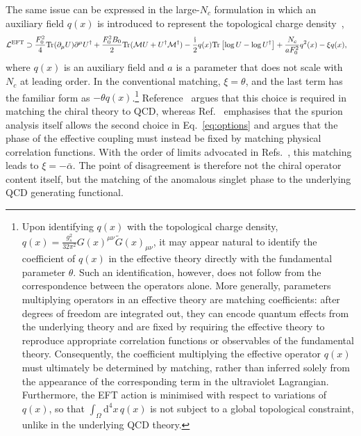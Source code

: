 \documentclass[review]{elsarticle}
\numberwithin{equation}{section}
\numberwithin{table}{section}
\numberwithin{figure}{section}
\def\d{\mathrm{d}}
\def\L{\mathcal{L}}
\def\i{\mathrm{i}}
\def\M{\mathcal{M}}
\begin{document}
The same issue can be expressed in the large-$N_c$ formulation in which an auxiliary field $q(x)$ is introduced to represent the topological charge density~\cite{DiVecchia:1980yfw},
\begin{align}
    \L^{\rm EFT} 
    &\supset
    \frac{F_0^2}{4} {\rm Tr}(\partial_\mu U)\partial^\mu U^\dagger
    + \frac{F_0^2B_0}{2} {\rm Tr}(\M U+U^\dagger\M^\dagger) - \frac{\i}{2}q(x) {\rm Tr}\left[ \log U-\log U^\dagger \right] + \frac{N_c}{aF_0^2}q^2(x) - \xi q(x), 
    \label{eq:large-Nc-chiral-Lagrangian}
\end{align}
where $q(x)$ is an auxiliary field and $a$ is a parameter that does not scale with $N_c$ at leading order. In the conventional matching, $\xi=\theta$, and the last term has the familiar form as $-\theta q(x)$.\footnote{Upon identifying $q(x)$ with the topological charge density, $q(x)=\frac{g_s^2}{32\pi^2} G(x)^{\mu\nu}\widetilde{G}(x)_{\mu\nu}$, it may appear natural to identify the coefficient of $q(x)$ in the effective theory directly with the fundamental parameter $\theta$. Such an identification, however, does not follow from the correspondence between the operators alone. More generally, parameters multiplying operators in an effective theory are matching coefficients: after degrees of freedom are integrated out, they can encode quantum effects from the underlying theory and are fixed by requiring the effective theory to reproduce appropriate correlation functions or observables of the fundamental theory. Consequently, the coefficient multiplying the effective operator $q(x)$ must ultimately be determined by matching, rather than inferred solely from the appearance of the corresponding term in the ultraviolet Lagrangian. Furthermore, the EFT action is minimised with respect to variations of $q(x)$, so that $\int_\Omega \d^4x\,q(x)$ is not subject to a global topological constraint, unlike in the underlying QCD theory.} Reference~\cite{Benabou:2025viy} argues that this choice is required in matching the chiral theory to QCD, whereas Ref.~\cite{Ai:2025quf} emphasises that the spurion analysis itself allows the second choice in Eq.~\eqref{eq:options} and argues that the phase of the effective coupling must instead be fixed by matching physical correlation functions. With the order of limits advocated in Refs.~\cite{Ai:2020ptm,Ai:2025quf}, this matching leads to $\xi=-\bar\alpha$. The point of disagreement is therefore not the chiral operator content itself, but the matching of the anomalous singlet phase to the underlying QCD generating functional.
\end{document}
